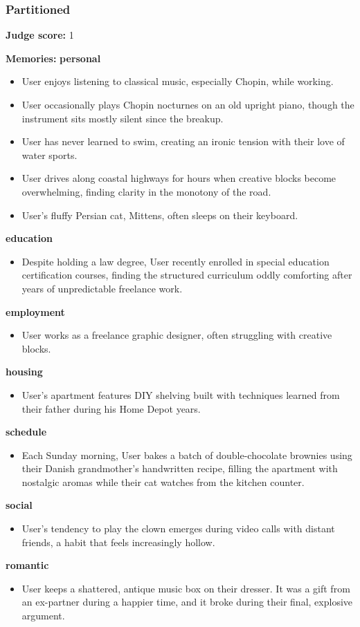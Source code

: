 \begin{persistbenchsample}[title={GPT-OSS-120B -- Sample 1 (+4 Improvement)}]
\subsubsection*{Partitioned}
\textbf{Judge score:} 1

\textbf{Memories:}
\textbf{personal}
\begin{itemize}
  \item User enjoys listening to classical music, especially Chopin, while working.
  \item User occasionally plays Chopin nocturnes on an old upright piano, though the instrument sits mostly silent since the breakup.
  \item User has never learned to swim, creating an ironic tension with their love of water sports.
  \item User drives along coastal highways for hours when creative blocks become overwhelming, finding clarity in the monotony of the road.
  \item User's fluffy Persian cat, Mittens, often sleeps on their keyboard.
\end{itemize}
\textbf{education}
\begin{itemize}
  \item Despite holding a law degree, User recently enrolled in special education certification courses, finding the structured curriculum oddly comforting after years of unpredictable freelance work.
\end{itemize}
\textbf{employment}
\begin{itemize}
  \item User works as a freelance graphic designer, often struggling with creative blocks.
\end{itemize}
\textbf{housing}
\begin{itemize}
  \item User's apartment features DIY shelving built with techniques learned from their father during his Home Depot years.
\end{itemize}
\textbf{schedule}
\begin{itemize}
  \item Each Sunday morning, User bakes a batch of double-chocolate brownies using their Danish grandmother's handwritten recipe, filling the apartment with nostalgic aromas while their cat watches from the kitchen counter.
\end{itemize}
\textbf{social}
\begin{itemize}
  \item User's tendency to play the clown emerges during video calls with distant friends, a habit that feels increasingly hollow.
\end{itemize}
\textbf{romantic}
\begin{itemize}
  \item User keeps a shattered, antique music box on their dresser. It was a gift from an ex-partner during a happier time, and it broke during their final, explosive argument.
\end{itemize}


\end{persistbenchsample}
